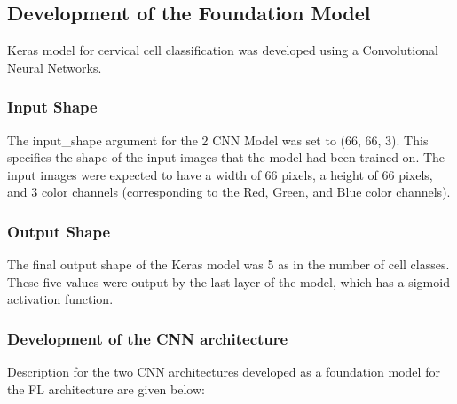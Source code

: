 \subsection{Development of the Foundation Model}

Keras model for cervical cell classification was developed using a Convolutional Neural Networks.

\subsubsection{Input Shape}
The input\_shape argument for the 2 CNN Model was set to (66, 66, 3). This specifies the shape of the input images that the model had been trained on. The input images were expected to have a width of 66 pixels, a height of 66 pixels, and 3 color channels (corresponding to the Red, Green, and Blue color channels).


\subsubsection{Output Shape} 
The final output shape of the Keras model was 5 as in the number of cell classes. These five values were output by the last layer of the model, which has a sigmoid activation function. 

\subsubsection{Development of the CNN architecture} 

Description for the two CNN architectures developed as a foundation model for the FL architecture are given below:

